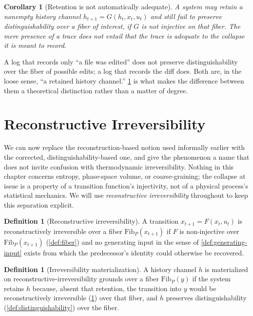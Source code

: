 \documentclass[11pt]{book}
\theoremstyle{plain}
\newtheorem{corollary}[theorem]{Corollary}
\theoremstyle{definition}
\newtheorem{definition}[theorem]{Definition}
\theoremstyle{remark}
\begin{document}
\begin{corollary}[Retention is not automatically adequate]
\label{cor:retention-not-adequate}
A system may retain a nonempty history channel $h_{t+1} = G(h_t, x_t,
u_t)$ and still fail to preserve distinguishability over a fiber of
interest, if $G$ is not injective on that fiber. The mere presence of
a trace does not entail that the trace is adequate to the collapse it
is meant to record.
\end{corollary}

A log that records only \enquote{a file was edited} does not preserve
distinguishability over the fiber of possible edits; a log that
records the diff does. Both are, in the loose sense, \enquote{a
retained history channel.} \cref{cor:retention-not-adequate} is what
makes the difference between them a theoretical distinction rather
than a matter of degree.

\section{Reconstructive Irreversibility}
\label{sec:reconstructive-irreversibility}

We can now replace the reconstruction-based notion used informally
earlier with the corrected, distinguishability-based one, and give the
phenomenon a name that does not invite confusion with thermodynamic
irreversibility. Nothing in this chapter concerns entropy, phase-space
volume, or coarse-graining; the collapse at issue is a property of a
transition function's injectivity, not of a physical process's
statistical mechanics. We will use \emph{reconstructive
irreversibility} throughout to keep this separation explicit.

\begin{definition}[Reconstructive irreversibility]
\label{def:irreversibility}
A transition $x_{t+1} = F(x_t, u_t)$ is reconstructively irreversible
over a fiber $\mathrm{Fib}_P(x_{t+1})$ if $F$ is non-injective over
$\mathrm{Fib}_P(x_{t+1})$ (\cref{def:fiber}) and no generating input in
the sense of \cref{def:generating-input} exists from which the
predecessor's identity could otherwise be recovered.
\end{definition}

\begin{definition}[Irreversibility materialization]
\label{def:irreversibility-materialization}
A history channel $h$ is materialized on reconstructive-irreversibility
grounds over a fiber $\mathrm{Fib}_P(y)$ if the system retains $h$
because, absent that retention, the transition into $y$ would be
reconstructively irreversible (\cref{def:irreversibility}) over that
fiber, and $h$ preserves distinguishability
(\cref{def:distinguishability}) over the fiber.
\end{definition}
\end{document}
